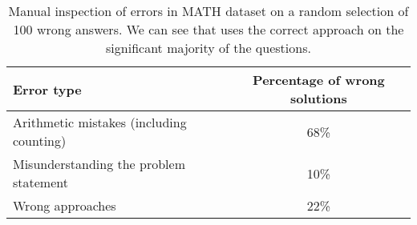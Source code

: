 \begin{table}[h]
\centering
\begin{tabular}{l|c}
\toprule
Error type & Percentage of wrong solutions \\ 
\midrule
\midrule
Arithmetic mistakes (including counting) & 68\% \\ 
Misunderstanding the problem statement & 10\% \\ 
Wrong approaches & 22\% \\
\bottomrule
\end{tabular}
\caption{Manual inspection of {\DV} errors in MATH dataset on a random selection of 100 wrong answers. We can see that {\DV} uses the correct approach on the significant majority of the questions.}
\end{table}






